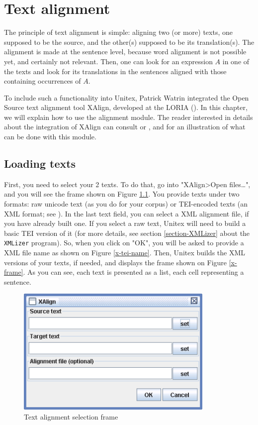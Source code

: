 \chapter{Text alignment}
\label{chap-alignment}
The principle of text alignment is simple: aligning two (or more) texts, one
supposed to be the source, and the other(s) supposed to be its translation(s). 
The alignment is made at the sentence level, because word alignment is not 
possible yet, and certainly not relevant. Then, one can look for an expression 
$A$ in one of the texts and look for its translations in the sentences aligned
with those containing occurrences of $A$.

\bigskip
\noindent To include such a functionality into Unitex, Patrick Watrin
integrated the Open Source text alignment tool XAlign, developed at the LORIA
(\cite{XAlign}). In this chapter, we will explain how to use the alignment
module. The reader interested in details about the integration of XAlign can
consult \cite{IGML_DumPau08} or \cite{IGML_PauDum08}, and \cite{dusko_xalign}
for an illustration of what can be done with this module.

\section{Loading texts}
First, you need to select your 2 texts. To do that, go into "XAlign>Open
files\ldots", and you will see the frame shown on Figure \ref{x-text-selection}.
You provide texts under two formats: raw unicode text (as you do for your
corpus) or TEI-encoded texts (an XML format; see \cite{TEI}). In the last text field, 
you can select a XML alignment file, if you have already built one. If you
select a raw text, Unitex will need to build a basic TEI version of it (for
more details, see section \ref{section-XMLizer} about the \verb+XMLizer+
program). So, when you click on "OK", you will be asked to provide a XML file 
name as shown on Figure \ref{x-tei-name}. Then, Unitex builds the XML versions of your texts, if
needed, and displays the frame shown on Figure \ref{x-frame}. As you can see, each 
text is presented as a list, each cell representing a sentence.

\begin{figure}[!ht]
\begin{center}
\includegraphics[width=9.5cm]{resources/img/figX-1.png}
\caption{Text alignment selection frame\label{x-text-selection}}
\end{center}
\end{figure}

